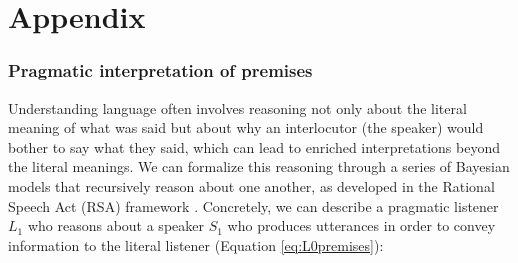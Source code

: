 \documentclass[floatsintext, doc]{apa6}
\begin{document}
%
%
%
%



\newpage




\newpage 

\appendix

\section{Appendix}

\subsubsection{Pragmatic interpretation of premises}

Understanding language often involves reasoning not only about the literal meaning of what was said but about why an interlocutor (the speaker) would bother to say what they said, which can lead to enriched interpretations beyond the literal meanings. 
We can formalize this reasoning through a series of Bayesian models that recursively reason about one another, as developed in the Rational Speech Act (RSA) framework \cite{Frank2012a, goodman2016pragmatic, scontras2018probabilistic}.
Concretely, we can describe a pragmatic listener $L_1$ who reasons about a speaker $S_1$ who produces utterances in order to convey information to the literal listener (Equation \ref{eq:L0premises}):
\end{document}

